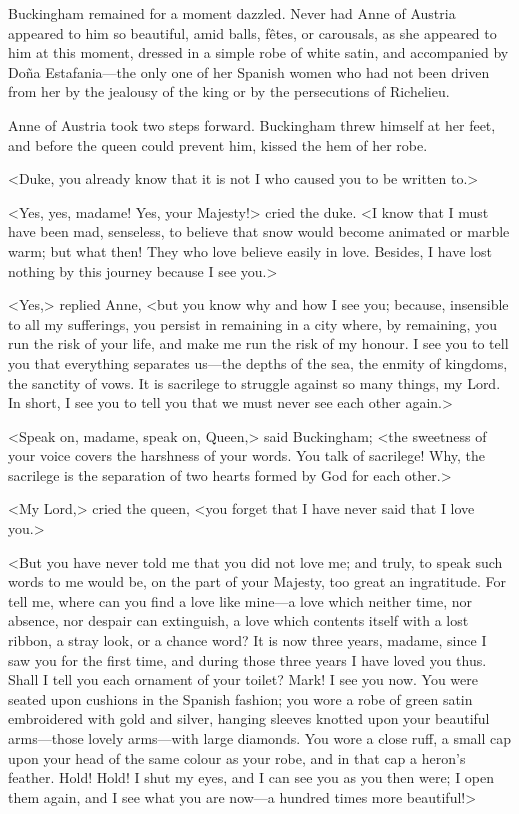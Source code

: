 Buckingham remained for a moment dazzled. Never had Anne of Austria appeared to him so beautiful, amid balls, fêtes, or carousals, as she appeared to him at this moment, dressed in a simple robe of white satin, and accompanied by Doña Estafania---the only one of her Spanish women who had not been driven from her by the jealousy of the king or by the persecutions of Richelieu. 

Anne of Austria took two steps forward. Buckingham threw himself at her feet, and before the queen could prevent him, kissed the hem of her robe. 

<Duke, you already know that it is not I who caused you to be written to.> 

<Yes, yes, madame! Yes, your Majesty!> cried the duke. <I know that I must have been mad, senseless, to believe that snow would become animated or marble warm; but what then! They who love believe easily in love. Besides, I have lost nothing by this journey because I see you.> 

<Yes,> replied Anne, <but you know why and how I see you; because, insensible to all my sufferings, you persist in remaining in a city where, by remaining, you run the risk of your life, and make me run the risk of my honour. I see you to tell you that everything separates us---the depths of the sea, the enmity of kingdoms, the sanctity of vows. It is sacrilege to struggle against so many things, my Lord. In short, I see you to tell you that we must never see each other again.> 

<Speak on, madame, speak on, Queen,> said Buckingham; <the sweetness of your voice covers the harshness of your words. You talk of sacrilege! Why, the sacrilege is the separation of two hearts formed by God for each other.> 

<My Lord,> cried the queen, <you forget that I have never said that I love you.> 

<But you have never told me that you did not love me; and truly, to speak such words to me would be, on the part of your Majesty, too great an ingratitude. For tell me, where can you find a love like mine---a love which neither time, nor absence, nor despair can extinguish, a love which contents itself with a lost ribbon, a stray look, or a chance word? It is now three years, madame, since I saw you for the first time, and during those three years I have loved you thus. Shall I tell you each ornament of your toilet? Mark! I see you now. You were seated upon cushions in the Spanish fashion; you wore a robe of green satin embroidered with gold and silver, hanging sleeves knotted upon your beautiful arms---those lovely arms---with large diamonds. You wore a close ruff, a small cap upon your head of the same colour as your robe, and in that cap a heron's feather. Hold! Hold! I shut my eyes, and I can see you as you then were; I open them again, and I see what you are now---a hundred times more beautiful!> 

